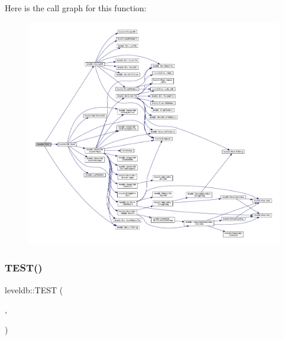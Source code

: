 Here is the call graph for this function\+:
\nopagebreak
\begin{figure}[H]
\begin{center}
\leavevmode
\includegraphics[width=350pt]{namespaceleveldb_a88d6fdcb16ed4edc65da40f383e6f23b_cgraph}
\end{center}
\end{figure}
\mbox{\label{namespaceleveldb_a63ad7fa22ccda6c82e41ab295482b8ba}} 
\subsubsection{\texorpdfstring{TEST()}{TEST()}\hspace{0.1cm}{\footnotesize\ttfamily [90/102]}}
{\footnotesize\ttfamily leveldb\+::\+T\+E\+ST (\begin{DoxyParamCaption}\item[{\mbox{\hyperlink{classleveldb_1_1_d_b_test}{D\+B\+Test}}}]{,  }\item[{Destroy\+Empty\+Dir}]{ }\end{DoxyParamCaption})}

